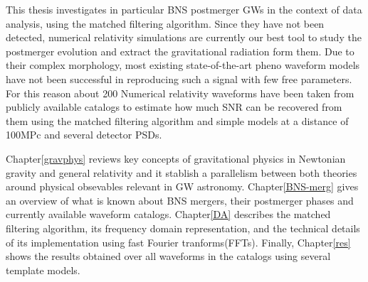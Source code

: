 This thesis investigates in particular BNS postmerger GWs in the context of data analysis, using the matched filtering algorithm. Since they have not been detected, numerical relativity simulations are currently our best tool to study the postmerger evolution and extract the gravitational radiation form them. Due to their complex morphology\cite{Maggiore:2018sht, Shibata:2019wef,Radice_2020}, most existing state-of-the-art pheno waveform models have not been successful in reproducing such a signal with few free parameters\cite{Breschi:2019srl, Tsang:2019esi, Soultanis:2021oia, https://doi.org/10.48550/arxiv.2205.09112}. For this reason about 200 Numerical relativity waveforms have been taken from publicly available catalogs to estimate how much SNR can be recovered from them using the matched filtering algorithm and simple models at a distance of 100MPc and several detector PSDs.

Chapter\ref{gravphys} reviews key concepts of gravitational physics in Newtonian gravity and general relativity and it stablish a parallelism between both theories around physical obsevables relevant in GW astronomy. Chapter\ref{BNS-merg} gives an overview of what is known about BNS mergers, their postmerger phases and currently available waveform catalogs. Chapter\ref{DA} describes the matched filtering algorithm, its frequency domain representation, and the technical details of its implementation using fast Fourier tranforms(FFTs). Finally, Chapter\ref{res} shows the results obtained over all waveforms in the catalogs using several template models.
